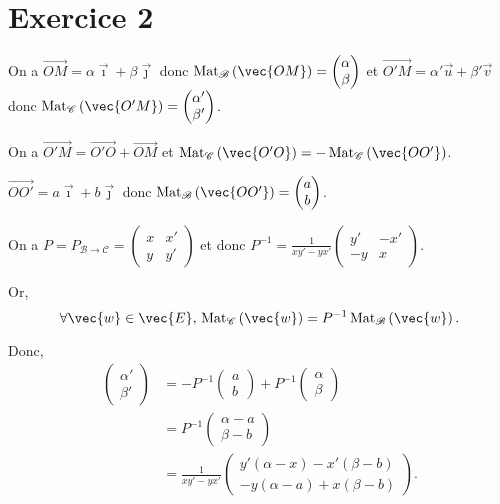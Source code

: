 \part{Exercice 2}

{
	\renewcommand{\i}{\ensuremath{\vec{\imath}}}
	\renewcommand{\j}{\ensuremath{\vec{\jmath}}}

	On a $\vec{OM} = \alpha \i + \beta \j$ donc $\Mat_\mathcal{B}\left( \vec{OM} \right) = \begin{pmatrix}
		\alpha\\
		\beta
	\end{pmatrix}$ et
	$\vec{O'M} = \alpha' \vec{u} + \beta' \vec{v}$  donc $\Mat_\mathcal{C}\left( \vec{O'M} \right) =\begin{pmatrix}
		\alpha'\\
		\beta'
	\end{pmatrix}$.

	On a $\vec{O'M} = \vec{O'O} + \vec{OM}$ et $\Mat_\mathcal{C}\left( \vec{O'O} \right) = -\Mat_\mathcal{C}\left( \vec{OO'} \right)$.

	$\vec{OO'} = a \i + b \j$ donc $\Mat_\mathcal{B}\left( \vec{O O'} \right) = \begin{pmatrix}
		a\\b
	\end{pmatrix}$.

	On a $P = P_{\mathcal{B} \to \mathcal{C}} = \begin{pmatrix}
		x&x'\\
		y&y'
	\end{pmatrix}$ et donc $P^{-1} = \frac{1}{xy' - yx'} \begin{pmatrix}
		y'&-x'\\
		-y&x
	\end{pmatrix}$.

	Or, \[
		\forall \vec{w} \in \vec{E},\,\Mat_{\mathcal{C}}\left( \vec{w} \right) = P^{-1} \Mat_{\mathcal{B}}\left( \vec{w} \right)
	.\]

	Donc,
	\begin{align*}
		\begin{pmatrix}
			\alpha'\\
			\beta'
		\end{pmatrix} &= -P^{-1} \begin{pmatrix}
			a\\b
		\end{pmatrix} + P^{-1} \begin{pmatrix}
			\alpha\\\beta
		\end{pmatrix}\\
		&= P^{-1} \begin{pmatrix}
			\alpha - a\\
			\beta - b
		\end{pmatrix} \\
		&= \frac{1}{xy'-yx'} \begin{pmatrix}
			y'(\alpha - x) - x'(\beta - b)\\
			-y(\alpha - a)  + x(\beta - b)
		\end{pmatrix}. \\
	\end{align*}
}

